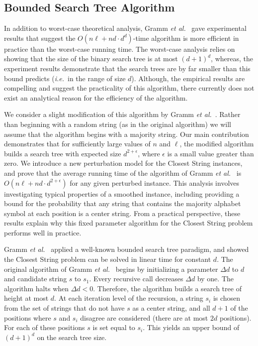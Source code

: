 \subsection{Bounded Search Tree Algorithm}

In addition to worst-case theoretical analysis, Gramm {\em et al.}\ \cite{GNR03} gave experimental results that suggest the $O(n\ell + nd \cdot d^d)$-time algorithm is more efficient in practice than the worst-case running time.  The worst-case analysis relies on showing that the size of the binary search tree is at most $(d + 1)^d$, whereas, the experiment results demonstrate that the search trees are by far smaller than this bound predicts ({\em i.e.}\ in the range of size $d$). Although, the empirical results are compelling and suggest the practicality of this algorithm, there currently does not exist an analytical reason for the efficiency of the algorithm.

We consider a slight modification of this algorithm by Gramm {\em et al.}\ \cite{GNR03}.  Rather than beginning with a random string (as in the original algorithm) we will assume that the algorithm begins with a majority string. Our main contribution demonstrates that for sufficiently large values of $n$ and $\ell$, the modified algorithm builds a search tree with expected size $d^{2 + \epsilon}$, where $\epsilon$ is a small value greater than zero.  We introduce a new perturbation model for the {\sc Closest String} instances, and prove that the average running time of the algorithm of Gramm {\em et al.}\ \cite{GNR03} is $O(n\ell + nd \cdot d^{2 + \epsilon})$ for any given perturbed instance.  This analysis involves investigating typical properties of a smoothed instance, including providing a bound for the probability that any string that contains the majority alphabet symbol at each position is a center string.  From a practical perspective, these results explain why this fixed parameter algorithm for the {\sc Closest String} problem performs well in practice. 

Gramm {\em et al.}\ \cite{GNR03} applied a well-known bounded search tree paradigm, and showed the {\sc Closest String} problem can be solved in linear time for constant $d$.  The original algorithm of Gramm {\em et al.}\ \cite{GNR03}  begins by initializing a parameter $\Delta d$ to $d$ and candidate string $s$ to $s_1$.  Every recursive call decreases $\Delta d$ by one.  The algorithm halts when $\Delta d < 0$. Therefore, the algorithm builds a search tree of height at most $d$.  At each iteration level of the recursion, a string $s_i$ is chosen from the set of strings that do not have $s$ as a center string, and all $d + 1$ of the positions where $s$ and $s_i$ disagree are considered (there are at most $2d$ positions).  For each of these positions $s$ is set equal to $s_i$.  This yields an upper bound of $(d + 1)^d$ on the search tree size.  

